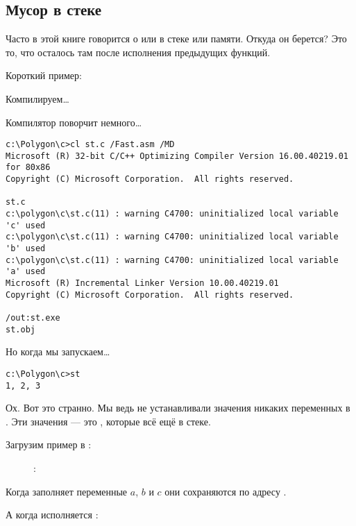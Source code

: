 \subsection{Мусор в стеке}

Часто в этой книге говорится о  или  в стеке или памяти.
Откуда он берется?
Это то, что осталось там после исполнения предыдущих функций.

Короткий пример:



Компилируем\dots



Компилятор поворчит немного\dots

\begin{lstlisting}
c:\Polygon\c>cl st.c /Fast.asm /MD
Microsoft (R) 32-bit C/C++ Optimizing Compiler Version 16.00.40219.01 for 80x86
Copyright (C) Microsoft Corporation.  All rights reserved.

st.c
c:\polygon\c\st.c(11) : warning C4700: uninitialized local variable 'c' used
c:\polygon\c\st.c(11) : warning C4700: uninitialized local variable 'b' used
c:\polygon\c\st.c(11) : warning C4700: uninitialized local variable 'a' used
Microsoft (R) Incremental Linker Version 10.00.40219.01
Copyright (C) Microsoft Corporation.  All rights reserved.

/out:st.exe
st.obj
\end{lstlisting}

Но когда мы запускаем\dots

\begin{lstlisting}
c:\Polygon\c>st
1, 2, 3
\end{lstlisting}

Ох. Вот это странно. Мы ведь не устанавливали значения никаких переменных в . 
Эти значения --- это , которые всё ещё в стеке.

\clearpage
Загрузим пример в \olly:

\begin{figure}[H]
\centering
{}
\caption{\olly: }
\label{fig:stack_noise_olly1}
\end{figure}

Когда  заполняет переменные $a$, $b$ и $c$ они сохраняются по адресу  \etc{}.

\clearpage
А когда исполняется :

